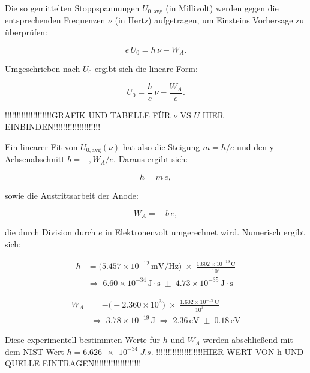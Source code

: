 Die so gemittelten Stoppspannungen $U_{0,\mathrm{avg}}$ (in Millivolt) werden gegen die entsprechenden Frequenzen $\nu$ (in Hertz) aufgetragen, um Einsteins Vorhersage zu überprüfen:

\begin{equation}
  e\,U_{0} = h\,\nu - W_{A}.
\end{equation}

Umgeschrieben nach $U_{0}$ ergibt sich die lineare Form:

\begin{equation}
  U_{0} = \frac{h}{e}\,\nu - \frac{W_{A}}{e}.
\end{equation}

!!!!!!!!!!!!!!!!!!!!GRAFIK UND TABELLE FÜR $\nu$ VS $U$ HIER EINBINDEN!!!!!!!!!!!!!!!!!!!!\

Ein linearer Fit von $U_{0,\mathrm{avg}}(\nu)$ hat also die Steigung $m = h/e$ und den y-Achsenabschnitt $b = -,W_{A}/e$. Daraus ergibt sich:


\begin{equation}
  h = m\,e,
\end{equation}

sowie die Austrittsarbeit der Anode:

\begin{equation}
  W_{A} = -\,b\,e,
\end{equation}

die durch Division durch $e$ in Elektronenvolt umgerechnet wird. Numerisch ergibt sich:

\begin{equation}
\begin{split}
  h &= \bigl(5.457\times10^{-12}\,\mathrm{mV/Hz}\bigr)\;\times\;\frac{1.602\times10^{-19}\,\mathrm{C}}{10^3}\\
    &\Longrightarrow\;6.60\times10^{-34}\,\mathrm{J\cdot s}\;\pm\;4.73\times10^{-35}\,\mathrm{J\cdot s}
\end{split}
\end{equation}

\begin{equation}
\begin{split}
  W_{A} &= -\bigl(-2.360\times10^{3}\bigr)\;\times\;\frac{1.602\times10^{-19}\,\mathrm{C}}{10^3}\\
        &\Longrightarrow\;3.78\times10^{-19}\,\mathrm{J}
         \;\Longrightarrow\;2.36\,\mathrm{eV}\;\pm\;0.18\,\mathrm{eV}
\end{split}
\end{equation}

Diese experimentell bestimmten Werte für $h$ und $W_{A}$ werden abschließend mit dem NIST-Wert $h=\SI{6.626e-34}{J.s}$.
!!!!!!!!!!!!!!!!!!!!HIER WERT VON h UND QUELLE EINTRAGEN!!!!!!!!!!!!!!!!!!!!